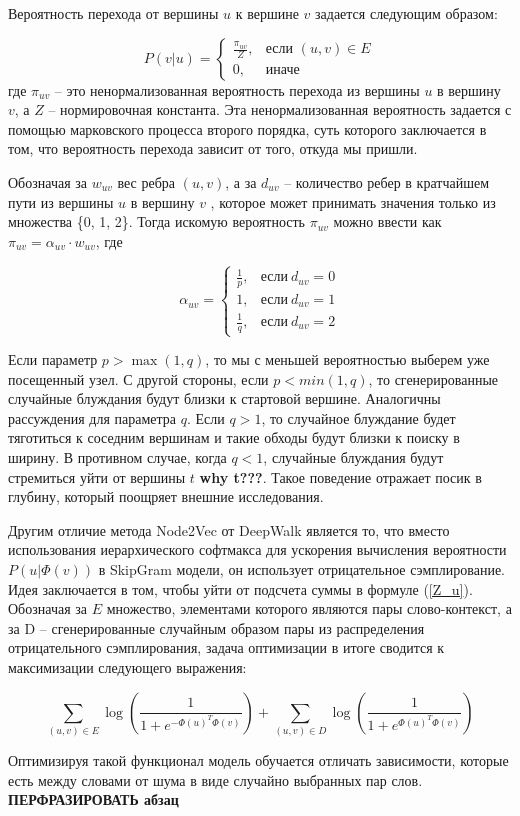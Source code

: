 Вероятность перехода от вершины $u$ к вершине $v$ задается следующим образом: 

$$ P(v|u) =
\begin{cases}
\frac{\pi_{uv}}{Z}, & \text{если } (u, v) \in E \\
0, & \text{иначе}
\end{cases}
$$
где $\pi_{uv}$ -- это ненормализованная вероятность перехода из вершины $u$ в вершину $v$, а $Z$ -- нормировочная константа. Эта ненормализованная вероятность задается с помощью марковского процесса второго порядка, суть которого заключается в том, что вероятность перехода зависит от того, откуда мы пришли.

Обозначая за $w_{uv}$ вес ребра $(u, v)$, а за $d_{uv}$ -- количество ребер в кратчайшем пути из вершины $u$ в вершину $v$ , которое может принимать значения только из множества \{0, 1, 2\}. Тогда искомую вероятность $\pi_{uv}$ можно ввести как $\pi_{uv} = \alpha_{uv} \cdot w_{uv}$, где 

$$
\alpha_{uv} = 
\begin{cases}
\frac{1}{p}, & \text{если} \  d_{uv} = 0 \\
1, & \text{если}  \ d_{uv} = 1 \\
\frac{1}{q}, & \text{если} \ d_{uv} = 2
\end{cases}
$$

Если параметр $p > \max(1, q)$, то мы с меньшей вероятностью выберем уже посещенный узел. С другой стороны, если $p < min(1, q)$, то сгенерированные случайные блуждания будут близки к стартовой вершине. Аналогичны рассуждения для параметра $q$. Если $q > 1$, то случайное блуждание будет тяготиться к соседним вершинам и такие обходы будут близки к поиску в ширину. В противном случае, когда $q < 1$, случайные блуждания будут стремиться уйти от вершины $t$ \textbf{why t???}. Такое поведение отражает посик в глубину, который поощряет внешние исследования.

Другим отличие метода Node2Vec от DeepWalk является то, что вместо использования иерархического софтмакса для ускорения вычисления вероятности $P(u | \Phi(v))$ в SkipGram модели, он использует отрицательное сэмплирование. Идея заключается в том, чтобы уйти от подсчета суммы в формуле (\ref{Z_u}). Обозначая за $E$ множество, элементами которого являются пары слово-контекст, а за D -- сгенерированные случайным образом пары из распределения отрицательного сэмплирования, задача оптимизации в итоге сводится к максимизации следующего выражения:

$$
\sum_{(u, v) \in E} \log (\frac{1}{1 + e^{-\Phi(u)^T \Phi(v)}}) + \sum_{(u, v) \in D} \log (\frac{1}{1 + e^{\Phi(u)^T \Phi(v)}}) 
$$

Оптимизируя такой функционал модель обучается отличать зависимости, которые есть между словами от шума в виде случайно
выбранных пар слов. \textbf{ПЕРФРАЗИРОВАТЬ абзац}




\clearpage
